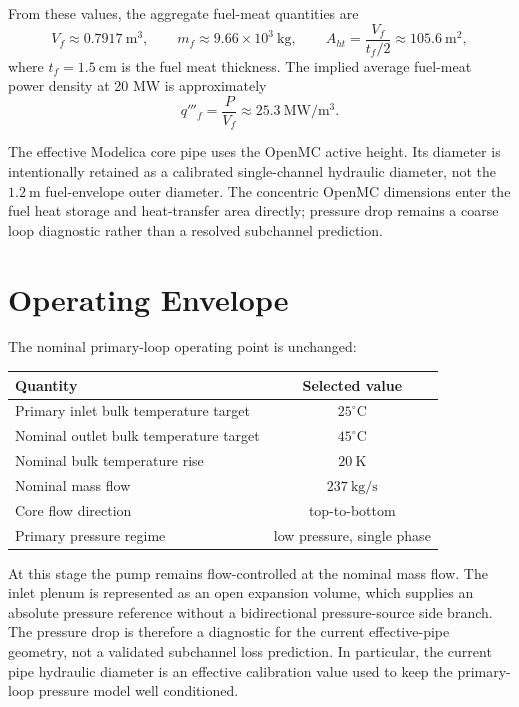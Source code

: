 \documentclass[11pt]{article}
\begin{document}
From these values, the aggregate fuel-meat quantities are
\[
V_f \approx 0.7917\ \mathrm{m^3},
\qquad
m_f \approx 9.66\times 10^3\ \mathrm{kg},
\qquad
A_{ht} = \frac{V_f}{t_f/2} \approx 105.6\ \mathrm{m^2},
\]
where $t_f=1.5\ \mathrm{cm}$ is the fuel meat thickness.  The implied
average fuel-meat power density at 20 MW is approximately
\[
q'''_f = \frac{P}{V_f} \approx 25.3\ \mathrm{MW/m^3}.
\]

The effective Modelica core pipe uses the OpenMC active height.  Its diameter
is intentionally retained as a calibrated single-channel hydraulic diameter,
not the $1.2\ \mathrm{m}$ fuel-envelope outer diameter.  The concentric
OpenMC dimensions enter the fuel heat storage and heat-transfer area directly;
pressure drop remains a coarse loop diagnostic rather than a resolved
subchannel prediction.

\section{Operating Envelope}

The nominal primary-loop operating point is unchanged:
\begin{center}
\begin{tabular}{lc}
\hline
Quantity & Selected value \\
\hline
Primary inlet bulk temperature target & $25^{\circ}\mathrm{C}$ \\
Nominal outlet bulk temperature target & $45^{\circ}\mathrm{C}$ \\
Nominal bulk temperature rise & $20\ \mathrm{K}$ \\
Nominal mass flow & $237\ \mathrm{kg/s}$ \\
Core flow direction & top-to-bottom \\
Primary pressure regime & low pressure, single phase \\
\hline
\end{tabular}
\end{center}

At this stage the pump remains flow-controlled at the nominal mass flow.
The inlet plenum is represented as an open expansion volume, which supplies
an absolute pressure reference without a bidirectional pressure-source side
branch.  The pressure drop is therefore a diagnostic for the current
effective-pipe geometry, not a validated subchannel loss prediction.  In
particular, the current pipe hydraulic diameter is an effective calibration
value used to keep the primary-loop pressure model well conditioned.
\end{document}
